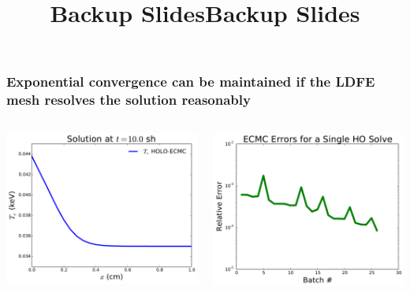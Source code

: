 \documentclass[xcolor=dvipsnames,hyperref={pdfpagelabels=false},unknownkeysallowed]{beamer}
\begin{document}



\date{}
\title{Backup Slides}
\begin{frame}
    \vspace{-0.21in}
    \titlepage \vspace{-0.2113in}
\end{frame}

\appendix
{}
\setcounter{finalframe}{\value{framenumber}}

\title{Backup Slides}
\author{}
\date{}

\begin{frame}
    \frametitle{Exponential convergence can be maintained if the LDFE mesh resolves the solution reasonably}
    \begin{columns}
    \begin{column}{0.5\textwidth}
        \vspace{0pt}
  \centering
    \includegraphics[width=\linewidth]{heated_marshak_new.pdf}
    \end{column}
    \begin{column}{0.5\textwidth}
        \vspace{0pt}
        \centering
        \includegraphics[width=\linewidth]{errors.pdf}

\end{column}
\end{columns}
\end{frame}
\end{document}
